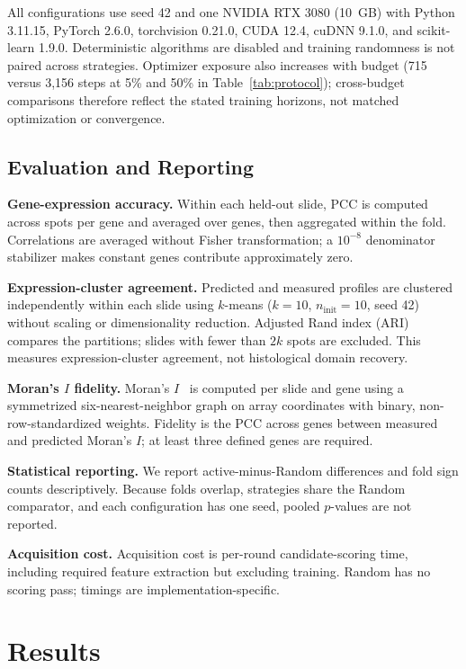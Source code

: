 \documentclass[]{spie}
\begin{document}
All configurations use seed 42 and one NVIDIA RTX 3080 (10~GB) with Python 3.11.15, PyTorch 2.6.0, torchvision 0.21.0, CUDA 12.4, cuDNN 9.1.0, and scikit-learn 1.9.0. Deterministic algorithms are disabled and training randomness is not paired across strategies. Optimizer exposure also increases with budget (715 versus 3,156 steps at 5\% and 50\% in Table~\ref{tab:protocol}); cross-budget comparisons therefore reflect the stated training horizons, not matched optimization or convergence.

\subsection{Evaluation and Reporting}
\label{sec:evaluation}

\noindent\textbf{Gene-expression accuracy.}
Within each held-out slide, PCC is computed across spots per gene and averaged over genes, then aggregated within the fold. Correlations are averaged without Fisher transformation; a $10^{-8}$ denominator stabilizer makes constant genes contribute approximately zero.

\noindent\textbf{Expression-cluster agreement.}
Predicted and measured profiles are clustered independently within each slide using $k$-means ($k=10$, $n_{\mathrm{init}}=10$, seed 42) without scaling or dimensionality reduction. Adjusted Rand index (ARI)~\cite{hubert1985comparing} compares the partitions; slides with fewer than $2k$ spots are excluded. This measures expression-cluster agreement, not histological domain recovery.

\noindent\textbf{Moran's $I$ fidelity.}
Moran's $I$~\cite{moran1950notes} is computed per slide and gene using a symmetrized six-nearest-neighbor graph on array coordinates with binary, non-row-standardized weights. Fidelity is the PCC across genes between measured and predicted Moran's $I$; at least three defined genes are required.

\noindent\textbf{Statistical reporting.}
We report active-minus-Random differences and fold sign counts descriptively. Because folds overlap, strategies share the Random comparator, and each configuration has one seed, pooled $p$-values are not reported.

\noindent\textbf{Acquisition cost.}
Acquisition cost is per-round candidate-scoring time, including required feature extraction but excluding training. Random has no scoring pass; timings are implementation-specific.

\section{Results}
\label{sec:results}
\end{document}
